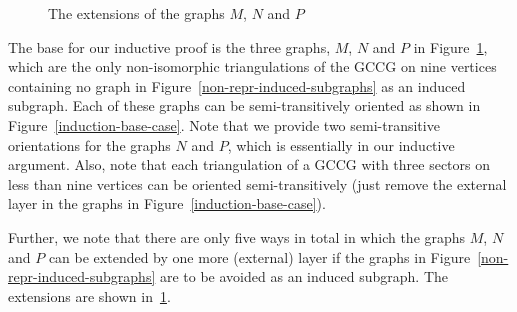 \documentclass[12pt]{article}
\numberwithin{equation}{section}
\begin{document}
\begin{figure}[!htbp]
\begin{center}
\caption{The extensions of the graphs $M$, $N$ and $P$}\label{3-possible-cases-andtheir-5-exten}
\end{center}
\end{figure}

The base for our inductive proof is the three graphs, $M$, $N$ and $P$ in Figure~\ref{3-possible-cases-andtheir-5-exten}, which are the only non-isomorphic  triangulations of the GCCG on nine vertices containing no graph in Figure~\ref{non-repr-induced-subgraphs} as an induced subgraph. Each of these graphs can be semi-transitively oriented as shown in Figure~\ref{induction-base-case}. Note that we provide two semi-transitive orientations for the graphs $N$ and $P$, which is essentially in our inductive argument. Also, note that each triangulation of a GCCG with three sectors on less than nine vertices can be oriented semi-transitively (just remove the external layer in the graphs in Figure~\ref{induction-base-case}).

Further, we note that there are only five ways in total in which the graphs $M$, $N$ and $P$ can be extended by one more (external) layer if the graphs in Figure~\ref{non-repr-induced-subgraphs} are to be avoided as an induced subgraph. The extensions are shown in~\ref{3-possible-cases-andtheir-5-exten}.
\end{document}
